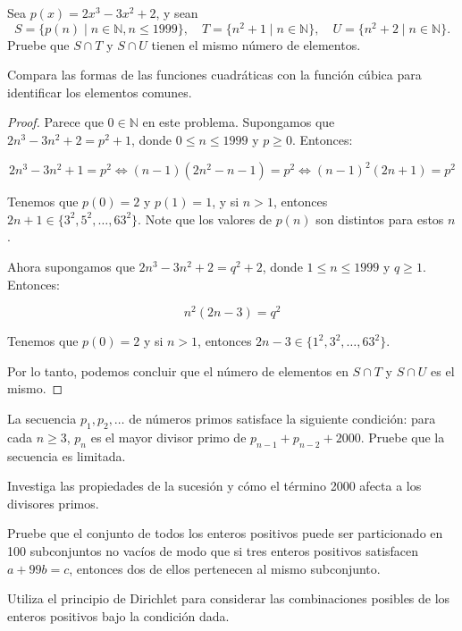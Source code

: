 \documentclass[11pt]{scrartcl}
\begin{document}
\begin{problem}[Rumania 1999] Sea $p(x) = 2x^3 - 3x^2 + 2$, y sean
\[
S = \{p(n) \mid n \in \mathbb{N}, n \leq 1999\}, \quad T = \{n^2 + 1 \mid n \in \mathbb{N}\}, \quad U = \{n^2 + 2 \mid n \in \mathbb{N}\}.
\]
Pruebe que $S \cap T$ y $S \cap U$ tienen el mismo número de elementos.
\begin{hint}
Compara las formas de las funciones cuadráticas con la función cúbica para identificar los elementos comunes.
\begin{proof}
    Parece que $0 \in \mathbb{N}$ en este problema. Supongamos que $2n^3 - 3n^2 + 2 = p^2 + 1$, donde $0 \leq n \leq 1999$ y $p \geq 0$. Entonces:

\[ 2n^3 - 3n^2 + 1 = p^2 \iff (n - 1)(2n^2 - n - 1) = p^2 \iff (n - 1)^2 (2n + 1) = p^2 \]

Tenemos que $p(0) = 2$ y $p(1) = 1$, y si $n > 1$, entonces $2n + 1 \in \{3^2, 5^2, \dots, 63^2\}$. Note que los valores de $p(n)$ son distintos para estos $n$.

Ahora supongamos que $2n^3 - 3n^2 + 2 = q^2 + 2$, donde $1 \leq n \leq 1999$ y $q \geq 1$. Entonces:

\[ n^2 (2n - 3) = q^2 \]

Tenemos que $p(0) = 2$ y si $n > 1$, entonces $2n - 3 \in \{1^2, 3^2, \dots, 63^2\}$.

Por lo tanto, podemos concluir que el número de elementos en $S \cap T$ y $S \cap U$ es el mismo.
\end{proof}
\end{hint}
\end{problem}

\begin{problem}[Polonia 2000] La secuencia $p_1, p_2, \dots$ de números primos satisface la siguiente condición: para cada $n \geq 3$, $p_n$ es el mayor divisor primo de $p_{n-1} + p_{n-2} + 2000$. Pruebe que la secuencia es limitada.
\begin{hint}
Investiga las propiedades de la sucesión y cómo el término 2000 afecta a los divisores primos.
\end{hint}
\end{problem}

\begin{problem}[Rusia 2000] Pruebe que el conjunto de todos los enteros positivos puede ser particionado en 100 subconjuntos no vacíos de modo que si tres enteros positivos satisfacen $a + 99b = c$, entonces dos de ellos pertenecen al mismo subconjunto.
\begin{hint}
Utiliza el principio de Dirichlet para considerar las combinaciones posibles de los enteros positivos bajo la condición dada.
\end{hint}
\end{problem}
\end{document}
